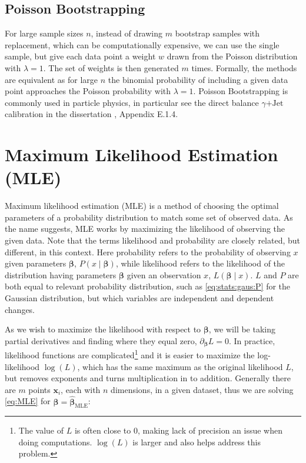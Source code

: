 \subsection{Poisson Bootstrapping}
\label{stats:bootstrapping:poisson}

For large sample sizes $n$, instead of drawing $m$ bootstrap samples with replacement,
which can be computationally expensive,
we can use the single sample,
but give each data point a weight $w$ drawn
from the Poisson distribution with $\lambda = 1$.
The set of weights is then generated $m$ times.
Formally, the methods are equivalent as for large $n$
the binomial probability of including a given data point approaches the Poisson probability with $\lambda = 1$.
Poisson Bootstrapping is commonly used in particle physics,
in particular see the direct balance $\gamma\text{+Jet}$ calibration
in the dissertation \cite{mepland_dissertation}, Appendix E.1.4.

\section{Maximum Likelihood Estimation (MLE)}
\label{stats:MLE}

Maximum likelihood estimation (MLE) is a method
of choosing the optimal parameters of a probability distribution
to match some set of observed data.
As the name suggests, MLE works by maximizing the likelihood of observing the given data.
Note that the terms likelihood and probability are closely related, but different, in this context.
Here probability refers to the probability of observing $x$ given parameters $\bm{\beta}$, $P\left(x \mid \bm{\beta}\right)$,
while likelihood refers to the likelihood of the distribution having parameters $\bm{\beta}$ given an observation $x$, $L\left(\bm{\beta} \mid x\right)$.
$L$ and $P$ are both equal to relevant probability distribution,
such as \cref{eq:stats:gaus:P} for the Gaussian distribution,
but which variables are independent and dependent changes.

As we wish to maximize the likelihood with respect to $\bm{\beta}$,
we will be taking partial derivatives and finding where they equal zero, $\partial_{\bm{\beta}} L = 0$.
In practice, likelihood functions are complicated\footnote{The value of $L$
is often close to $0$, making lack of precision an issue when doing computations.
$\log\left(L\right)$ is larger and also helps address this problem.} and
it is easier to maximize the log-likelihood $\log\left(L\right)$,
which has the same maximum as the original likelihood $L$,
but removes exponents and turns multiplication in to addition.
Generally there are $m$ points $\mathbf{x}_{i}$, each with $n$ dimensions, in a given dataset,
thus we are solving \cref{eq:MLE} for $\bm{\beta} = \hat{\bm{\beta}}_{\text{MLE}}$:

